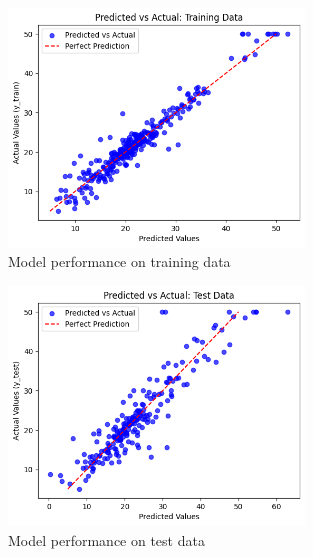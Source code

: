 \documentclass[12pt,a4paper]{article}
\begin{document}
\begin{itemize}
\begin{figure}[h!]
    \centering
    \includegraphics[width=0.7\textwidth]{3_train_img} 
    \caption{Model performance on training data}
    \label{fig:example}
\end{figure}
\begin{figure}[h!]
    \centering
    \includegraphics[width=0.7\textwidth]{3_test_img} 
    \caption{Model performance on test data}
    \label{fig:example}
\end{figure}


\end{itemize}
\end{document}
